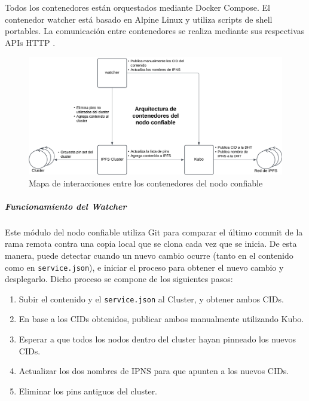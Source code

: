 Todos los contenedores están orquestados mediante Docker Compose. El contenedor watcher está basado en Alpine Linux y utiliza scripts de shell portables. La comunicación entre contenedores se realiza mediante sus respectivas APIs HTTP \cite{kubo-api} \cite{cluster-api}.

\begin{figure}[h!]
    \centering
    \includegraphics[width=1\linewidth]{img/solucion-ipfs/contenedores-trusted-peer.png}
    \caption{Mapa de interacciones entre los contenedores del nodo confiable}
    \label{fig:contenedores-trusted-peer}
\end{figure}

\subparagraph{Funcionamiento del Watcher} Este módulo del nodo confiable utiliza Git para comparar el último commit de la rama remota contra una copia local que se clona cada vez que se inicia. De esta manera, puede detectar cuando un nuevo cambio ocurre (tanto en el contenido como en \texttt{service.json}), e iniciar el proceso para obtener el nuevo cambio y desplegarlo. Dicho proceso se compone de los siguientes pasos:
\begin{enumerate}
    \item Subir el contenido y el \texttt{service.json} al Cluster, y obtener ambos CIDs.
    \item En base a los CIDs obtenidos, publicar ambos manualmente utilizando Kubo.
    \item Esperar a que todos los nodos dentro del cluster hayan pinneado los nuevos CIDs.
    \item Actualizar los dos nombres de IPNS para que apunten a los nuevos CIDs.
    \item Eliminar los pins antiguos del cluster.
\end{enumerate}

